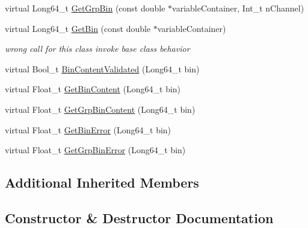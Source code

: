 \begin{DoxyCompactItemize}
\item 
virtual Long64\+\_\+t \mbox{\hyperlink{classQn_1_1CorrectionProfileChannelizedIngress_aa28e227c6ba5d7c8ecc03b9c4180a523}{Get\+Grp\+Bin}} (const double $\ast$variable\+Container, Int\+\_\+t n\+Channel)
\item 
\mbox{\label{classQn_1_1CorrectionProfileChannelizedIngress_a2716e7f057235fecd959ca967c29fd63}} 
virtual Long64\+\_\+t \mbox{\hyperlink{classQn_1_1CorrectionProfileChannelizedIngress_a2716e7f057235fecd959ca967c29fd63}{Get\+Bin}} (const double $\ast$variable\+Container)
\begin{DoxyCompactList}\small\item\em wrong call for this class invoke base class behavior \end{DoxyCompactList}\item 
virtual Bool\+\_\+t \mbox{\hyperlink{classQn_1_1CorrectionProfileChannelizedIngress_ad21ca0cea3bb64b832da59a99da2603a}{Bin\+Content\+Validated}} (Long64\+\_\+t bin)
\item 
virtual Float\+\_\+t \mbox{\hyperlink{classQn_1_1CorrectionProfileChannelizedIngress_a64fbd6f89e6ddcb0ef22189e868594fa}{Get\+Bin\+Content}} (Long64\+\_\+t bin)
\item 
virtual Float\+\_\+t \mbox{\hyperlink{classQn_1_1CorrectionProfileChannelizedIngress_ae150d82ad7a8b0cdc830dd41b46296ed}{Get\+Grp\+Bin\+Content}} (Long64\+\_\+t bin)
\item 
virtual Float\+\_\+t \mbox{\hyperlink{classQn_1_1CorrectionProfileChannelizedIngress_ace03557cdc8d3f87637b0f4108308cc0}{Get\+Bin\+Error}} (Long64\+\_\+t bin)
\item 
virtual Float\+\_\+t \mbox{\hyperlink{classQn_1_1CorrectionProfileChannelizedIngress_acc740b3b8325d5e0604a1826edbf6085}{Get\+Grp\+Bin\+Error}} (Long64\+\_\+t bin)
\end{DoxyCompactItemize}
\subsection*{Additional Inherited Members}


\subsection{Constructor \& Destructor Documentation}
\mbox{\label{classQn_1_1CorrectionProfileChannelizedIngress_a9afde955744af4075b927913246ec065}} 
